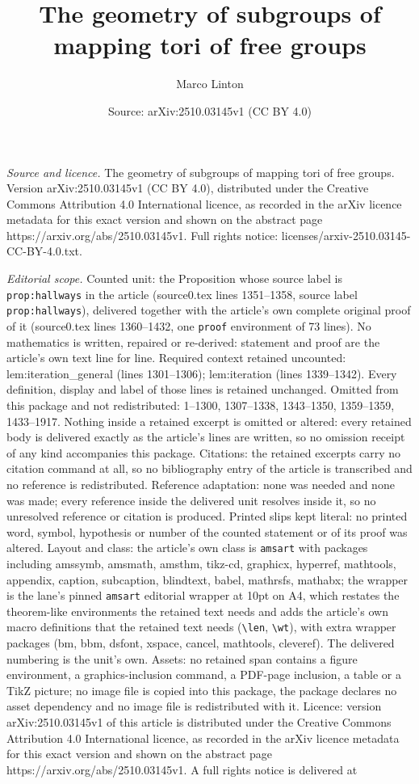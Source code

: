 \documentclass[10pt,a4paper]{amsart}
\title[The geometry of subgroups of mapping tori of free groups]{The geometry of subgroups of mapping tori of free groups}
\author{Marco Linton}
\date{Source: arXiv:2510.03145v1 (CC BY 4.0)}
\begin{document}
\maketitle

\noindent\emph{Source and licence.} The geometry of subgroups of mapping tori of free groups. Version arXiv:2510.03145v1 (CC BY 4.0), distributed under the Creative Commons Attribution 4.0 International licence, as recorded in the arXiv licence metadata for this exact version and shown on the abstract page https://arxiv.org/abs/2510.03145v1. Full rights notice: licenses/arxiv-2510.03145-CC-BY-4.0.txt.\par\smallskip

\noindent\textit{Editorial scope.} Counted unit: the Proposition whose source label is \texttt{prop:hallways} in the article (source0.tex lines 1351--1358, source label \texttt{prop:hallways}), delivered together with the article's own complete original proof of it (source0.tex lines 1360--1432, one \texttt{proof} environment of 73 lines). No mathematics is written, repaired or re-derived: statement and proof are the article's own text line for line. Required context retained uncounted: lem:iteration\_general (lines 1301--1306); lem:iteration (lines 1339--1342). Every definition, display and label of those lines is retained unchanged. Omitted from this package and not redistributed: 1--1300, 1307--1338, 1343--1350, 1359--1359, 1433--1917. Nothing inside a retained excerpt is omitted or altered: every retained body is delivered exactly as the article's lines are written, so no omission receipt of any kind accompanies this package. Citations: the retained excerpts carry no citation command at all, so no bibliography entry of the article is transcribed and no reference is redistributed. Reference adaptation: none was needed and none was made; every reference inside the delivered unit resolves inside it, so no unresolved reference or citation is produced. Printed slips kept literal: no printed word, symbol, hypothesis or number of the counted statement or of its proof was altered. Layout and class: the article's own class is \texttt{amsart} with packages including amssymb, amsmath, amsthm, tikz-cd, graphicx, hyperref, mathtools, appendix, caption, subcaption, blindtext, babel, mathrsfs, mathabx; the wrapper is the lane's pinned \texttt{amsart} editorial wrapper at 10pt on A4, which restates the theorem-like environments the retained text needs and adds the article's own macro definitions that the retained text needs (\texttt{\textbackslash len}, \texttt{\textbackslash wt}), with extra wrapper packages (bm, bbm, dsfont, xspace, cancel, mathtools, cleveref). The delivered numbering is the unit's own. Assets: no retained span contains a figure environment, a graphics-inclusion command, a PDF-page inclusion, a table or a TikZ picture; no image file is copied into this package, the package declares no asset dependency and no image file is redistributed with it. Licence: version arXiv:2510.03145v1 of this article is distributed under the Creative Commons Attribution 4.0 International licence, as recorded in the arXiv licence metadata for this exact version and shown on the abstract page https://arxiv.org/abs/2510.03145v1. A full rights notice is delivered at 
\end{document}
